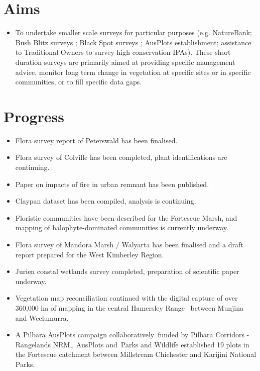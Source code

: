 \documentclass[version=last,
    paper=a4, %
    10pt, %
    usenames,
    dvipsnames,
    oneside, %
    headings=openany, %
    DIV=15 %
]{scrbook}
\begin{document}
\section*{Aims}
\begin{itemize}
\itemsep1pt\parskip0pt
\item
  To undertake smaller scale surveys for particular purposes (e.g.
  NatureBank; Bush Blitz surveys ; Black Spot surveys ; AusPlots
  establishment; assistance to Traditional Owners to survey high
  conservation IPAs). These short duration surveys are primarily aimed
  at providing specific management advice, monitor long term change in
  vegetation at specific sites or in specific communities, or to fill
  specific data gaps.
\end{itemize}



\section*{Progress}
\begin{itemize}
\itemsep1pt\parskip0pt
\item
  Flora survey report of Peterswald has been finalised.
\item
  Flora survey of Colville has been completed, plant identifications are
  continuing.
\item
  Paper on impacts of fire in urban remnant has been published.
\item
  Claypan dataset has been compiled, analysis is continuing.
\item
  Floristic communities have been described for the Fortescue Marsh, and
  mapping of halophyte-dominated communities is currently underway.
\item
  Flora survey of Mandora Marsh / Walyarta has been finalised and a
  draft report prepared for the West Kimberley Region.
\item
  Jurien coastal wetlands survey completed, preparation of scientific
  paper underway.
\item
  Vegetation map reconciliation continued with the digital capture of
  over 360,000 ha of mapping in the central Hamersley Range~ between
  Munjina and Weelumurra.
\item
  A Pilbara AusPlots campaign collaboratively~funded by Pilbara
  Corridors - Rangelands NRM,, AusPlots and~Parks and Wildlife
  established 19 plots in the Fortescue catchment between Millstream
  Chichester and Karijini National Parks.
\end{itemize}
\end{document}
